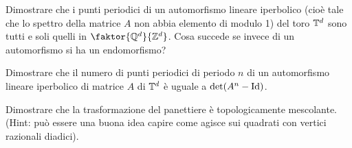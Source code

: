 \begin{exercise}
    Dimostrare che i punti periodici di un automorfismo lineare iperbolico (cioè tale che lo spettro della matrice $ A $ non abbia elemento di modulo 1) del toro $ \mathbb{T}^d $ sono tutti e soli quelli in $ \faktor{\Q^d}{\Z^d} $. Cosa succede se invece di un automorfismo si ha un endomorfismo?
\end{exercise}

\begin{exercise}
    Dimostrare che il numero di punti periodici di periodo $ n $ di un automorfismo lineare iperbolico di matrice $ A $ di $ \mathbb{T}^d $ è uguale a $ \det(A^n - \mathrm{Id}) $.    
\end{exercise}

\begin{exercise}
    Dimostrare che la trasformazione del panettiere è topologicamente mescolante. (Hint: può essere una buona idea capire come agisce sui quadrati con vertici razionali diadici).
\end{exercise}



